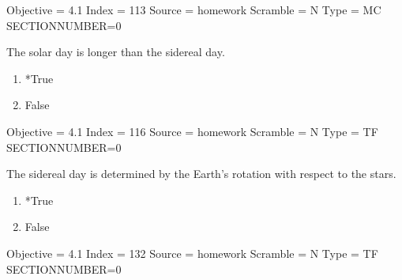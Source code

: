 \documentclass[11pt]{article}
\begin{document}
\begin{enumerate}
\begin{minipage}{\textwidth}
\begin{minipage}{\textwidth}
Objective = 4.1
Index = 113
Source = homework
Scramble = N
Type = MC
SECTIONNUMBER=0
\end{minipage}
\end{minipage}
\vskip 0.20in

\begin{minipage}{\textwidth}
\begin{minipage}{\textwidth}
\item The solar day is longer than the sidereal day.
\begin{multicols}{3}
\begin{enumerate} 
\setlength{\itemsep}{1pt} 
\setlength{\parskip}{0pt} 
\setlength{\parsep}{0pt}
\setlength{\multicolsep}{1pt} 
\item *True
\item False
\end{enumerate} 
\vfill 
\end{multicols}

Objective = 4.1
Index = 116
Source = homework
Scramble = N
Type = TF
SECTIONNUMBER=0
\end{minipage}
\end{minipage}
\vskip 0.20in

\begin{minipage}{\textwidth}
\begin{minipage}{\textwidth}
\item The sidereal day is determined by the Earth's rotation with respect to the stars.
\begin{multicols}{3}
\begin{enumerate} 
\setlength{\itemsep}{1pt} 
\setlength{\parskip}{0pt} 
\setlength{\parsep}{0pt}
\setlength{\multicolsep}{1pt} 
\item *True
\item False
\end{enumerate} 
\vfill 
\end{multicols}

Objective = 4.1
Index = 132
Source = homework
Scramble = N
Type = TF
SECTIONNUMBER=0
\end{minipage}
\end{minipage}
\vskip 0.20in


\end{enumerate}
\end{document}
